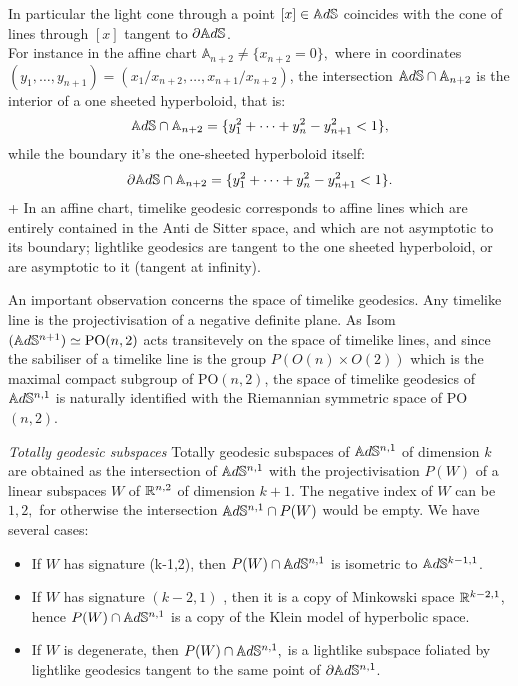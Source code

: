 In particular the light cone through a point $[x]\in \mathbb{A}d\mathbb{S}$ coincides with the cone of lines through $[x]$ tangent to $\partial \mathbb{A}d\mathbb{S}$.\\ For instance in the affine chart $\mathbb{A}_{n+2}\neq\{x_{n+2}=0\},$ where in coordinates $(y_1, \dots, y_{n+1})=(x_1/x_{n+2},\dots, x_{n+1}/x_{n+2})$, the intersection $\mathbb{A}d\mathbb{S}\cap\mathbb{A}_{n+2}$ is the interior of a one sheeted hyperboloid, that is: 
\[
    \mathbb{A}d\mathbb{S}\cap\mathbb{A}_{n+2}=\{y_1^2+\dots+y_n^2-y_{n+1}^2<1\},
\]
 while the boundary it's the one-sheeted hyperboloid itself: 
 \[
    \partial\mathbb{A}d\mathbb{S}\cap\mathbb{A}_{n+2}=\{y_1^2+\dots+y_n^2-y_{n+1}^2<1\}.
\]+
In an affine chart, timelike geodesic corresponds to affine lines which are entirely contained in the Anti de Sitter space, and which are not asymptotic to its boundary; lightlike geodesics are tangent to the one sheeted hyperboloid, or are asymptotic to it (tangent at infinity).

\begin{observation} An important observation concerns the space of timelike geodesics. Any timelike line is the projectivisation of a negative definite plane. As Isom$(\mathbb{A}d\mathbb{S}^{n+1})\simeq \text{PO}(n,2)$ acts transitevely on the space of timelike lines, and since the sabiliser of a timelike line is the group $P(O(n)\times O(2))$ which is the maximal compact subgroup of $\text{PO}(n,2)$, the space of timelike geodesics of $\mathbb{A}d\mathbb{S}^{n,1}$ is naturally identified with the Riemannian symmetric space of PO$(n,2)$.
\end{observation}

\noindent\textit{Totally geodesic subspaces} Totally geodesic subspaces of $\mathbb{A}d\mathbb{S}^{n,1}$ of dimension $k$ are obtained as the intersection of $\mathbb{A}d\mathbb{S}^{n,1}$ with the projectivisation $P(W)$ of a linear subspaces $W$ of $\mathbb{R}^{n,2}$ of dimension $k+1.$ The negative index of $W$ can be $1, 2,$ for otherwise the intersection $\mathbb{A}d\mathbb{S}^{n,1}\cap P(W)$ would be empty. We have several cases: 
\begin{itemize}
    \item If $W$ has signature (k-1,2), then $P(W)\cap \mathbb{A}d\mathbb{S}^{n,1}$ is isometric to $\mathbb{A}d\mathbb{S}^{k-1,1}$. 
    \item If $W$ has signature $(k-2, 1)$ , then it is a copy of Minkowski space $\mathbb{R}^{k-2,1}$, hence $P(W)\cap \mathbb{A}d\mathbb{S}^{n,1}$ is a copy of the Klein model of hyperbolic space. 
    \item If $W$ is degenerate, then $P(W)\cap \mathbb{A}d\mathbb{S}^{n,1},$ is a lightlike subspace foliated by lightlike geodesics tangent to the same point of $\partial\mathbb{A}d\mathbb{S}^{n,1}$. 
\end{itemize}  

